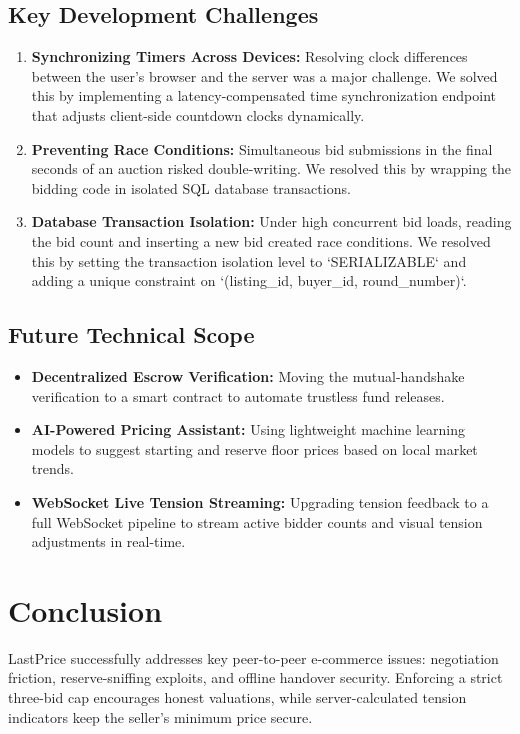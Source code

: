 \documentclass[12pt,a4paper,oneside]{report}
\begin{document}
\section{Key Development Challenges}
\begin{enumerate}
    \item \textbf{Synchronizing Timers Across Devices:} Resolving clock differences between the user's browser and the server was a major challenge. We solved this by implementing a latency-compensated time synchronization endpoint that adjusts client-side countdown clocks dynamically.
    \item \textbf{Preventing Race Conditions:} Simultaneous bid submissions in the final seconds of an auction risked double-writing. We resolved this by wrapping the bidding code in isolated SQL database transactions.
    \item \textbf{Database Transaction Isolation:} Under high concurrent bid loads, reading the bid count and inserting a new bid created race conditions. We resolved this by setting the transaction isolation level to `SERIALIZABLE` and adding a unique constraint on `(listing_id, buyer_id, round_number)`.
\end{enumerate}

\section{Future Technical Scope}
\begin{itemize}
    \item \textbf{Decentralized Escrow Verification:} Moving the mutual-handshake verification to a smart contract to automate trustless fund releases.
    \item \textbf{AI-Powered Pricing Assistant:} Using lightweight machine learning models to suggest starting and reserve floor prices based on local market trends.
    \item \textbf{WebSocket Live Tension Streaming:} Upgrading tension feedback to a full WebSocket pipeline to stream active bidder counts and visual tension adjustments in real-time.
\end{itemize}

\chapter{Conclusion}

LastPrice successfully addresses key peer-to-peer e-commerce issues: negotiation friction, reserve-sniffing exploits, and offline handover security. Enforcing a strict three-bid cap encourages honest valuations, while server-calculated tension indicators keep the seller's minimum price secure. 
\end{document}
